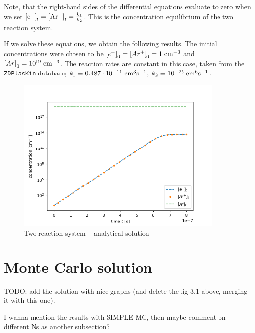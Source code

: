 Note, that the right-hand sides of the differential equations evaluate to zero when we set $\left[ \rm e^{-}\right]_t = \left[\rm Ar^{+}\right]_t = \frac{k_1}{k_2}$. This is the concentration equilibrium of the two reaction system. 

If we solve these equations, we obtain the following results. The initial concentrations were chosen to be $\left[e^{-}\right]_0 = \left[Ar^{+}\right]_0 = 1\;\rm cm^{-3}$ and $\left[Ar\right]_0 = 10^{19}\;\rm cm^{-3}$. The reaction rates are constant in this case, taken from the \verb|ZDPlasKin| database; $k_1 = 0.487\cdot10^{-11} \;\rm cm^{3} \rm s^{-1}$, $k_2 = 10^{-25} \;\rm cm^{6} \rm s^{-1}$.

\begin{figure}
    \centering
    \includegraphics[width=0.9\textwidth]{grafy/2reaction_analytical.png}
    \caption{Two reaction system -- analytical solution}
    \label{fig:my_label}
\end{figure}

\section{Monte Carlo solution}

TODO: add the solution with nice graphs (and delete the fig 3.1 above, merging it with this one).

I wanna mention the results with SIMPLE MC, then maybe comment on different Ns as another subsection?